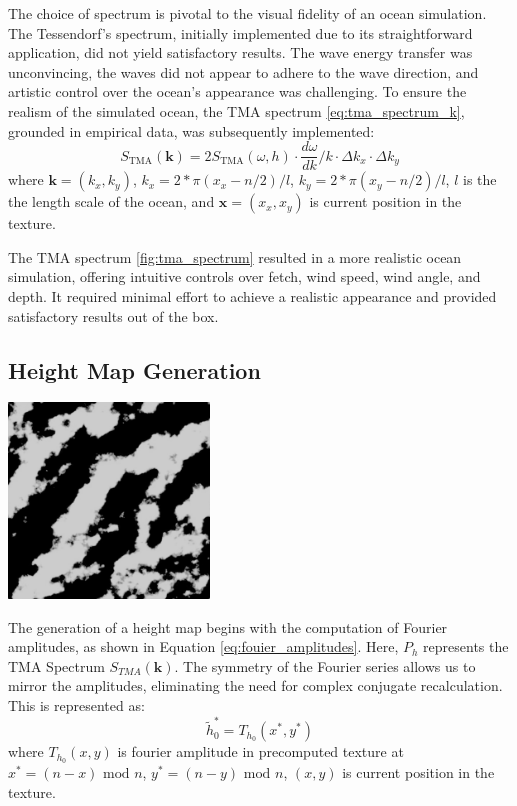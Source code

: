 The choice of spectrum is pivotal to the visual fidelity of an ocean simulation. The Tessendorf's spectrum, initially implemented due to its straightforward application, did not yield satisfactory results. The wave energy transfer was unconvincing, the waves did not appear to adhere to the wave direction, and artistic control over the ocean's appearance was challenging. To ensure the realism of the simulated ocean, the TMA spectrum \ref{eq:tma_spectrum_k}, grounded in empirical data, was subsequently implemented:
$$
    S_{\text{TMA}}(\mathbf{k}) = 2S_{\text{TMA}}(\omega, h) \cdot \frac{d\omega}{dk} / k \cdot \Delta k_x \cdot \Delta k_y
$$
where $\mathbf{k} = (k_x, k_y)$, $k_x = 2 * \pi (x_x - n/2)/ l$, $k_y = 2 * \pi (x_y - n/2)/ l$, $l$ is the the length scale of the ocean, 
and $\mathbf{x} = (x_x, x_y)$ is current position in the texture. 

The TMA spectrum \ref{fig:tma_spectrum} resulted in a more realistic ocean simulation, offering intuitive controls over fetch, wind speed, wind angle, and depth. It required minimal effort to achieve a realistic appearance and provided satisfactory results out of the box.

\subsection{Height Map Generation}

\begin{minipage}{1\textwidth}
    \centering
    \includegraphics[width=0.40\textwidth]{"images/tma_height.png"}
    \label{fig:tma_height_map}
\end{minipage}

The generation of a height map begins with the computation of Fourier amplitudes, as shown in Equation \ref{eq:fouier_amplitudes}. Here, $P_h$ represents the TMA Spectrum $S_{TMA}(\mathbf{k})$.
The symmetry of the Fourier series allows us to mirror the amplitudes, eliminating the need for complex conjugate recalculation. This is represented as:
\begin{equation}
    \tilde{h}^{*}_0 = T_{h_0}(x^{*}, y^{*})
\end{equation}
where $T_{h_0}(x, y)$ is fourier amplitude in precomputed texture at $x^{*} = (n - x) \text{ mod } n$, $y^{*} = (n - y) \text{ mod } n$, $(x, y)$ is current position in the texture.

